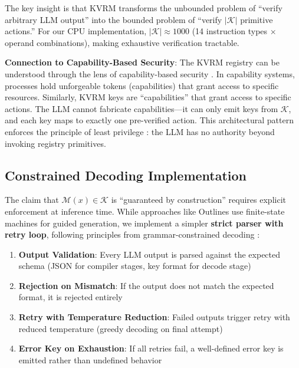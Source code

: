 \documentclass[11pt,a4paper]{article}
\begin{document}
The key insight is that KVRM transforms the unbounded problem of ``verify arbitrary LLM output'' into the bounded problem of ``verify $|\mathcal{K}|$ primitive actions.'' For our CPU implementation, $|\mathcal{K}| \approx 1000$ (14 instruction types $\times$ operand combinations), making exhaustive verification tractable.

\textbf{Connection to Capability-Based Security}: The KVRM registry can be understood through the lens of capability-based security \citep{dennis1966capabilities, levy1984capabilities}. In capability systems, processes hold unforgeable tokens (capabilities) that grant access to specific resources. Similarly, KVRM keys are ``capabilities'' that grant access to specific actions. The LLM cannot fabricate capabilities---it can only emit keys from $\mathcal{K}$, and each key maps to exactly one pre-verified action. This architectural pattern enforces the principle of least privilege \citep{saltzer1975protection, miller2003paradigm}: the LLM has no authority beyond invoking registry primitives.

\subsection{Constrained Decoding Implementation}
\label{sec:constrained-decoding}

The claim that $\mathcal{M}(x) \in \mathcal{K}$ is ``guaranteed by construction'' requires explicit enforcement at inference time. While approaches like Outlines \citep{willard2023outlines} use finite-state machines for guided generation, we implement a simpler \textbf{strict parser with retry loop}, following principles from grammar-constrained decoding \citep{geng2023grammar, hokamp2017lexically}:

\begin{enumerate}
    \item \textbf{Output Validation}: Every LLM output is parsed against the expected schema (JSON for compiler stages, key format for decode stage)
    \item \textbf{Rejection on Mismatch}: If the output does not match the expected format, it is rejected entirely
    \item \textbf{Retry with Temperature Reduction}: Failed outputs trigger retry with reduced temperature (greedy decoding on final attempt)
    \item \textbf{Error Key on Exhaustion}: If all retries fail, a well-defined error key is emitted rather than undefined behavior
\end{enumerate}
\end{document}
